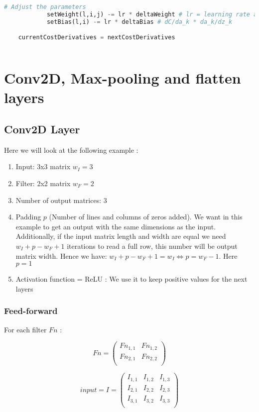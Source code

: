 \documentclass[11pt,a4paper]{report}
\begin{document}
\begin{lstlisting}[language=Python]
            # Adjust the parameters
            setWeight(l,i,j) -= lr * deltaWeight # lr = learning rate and we have dC/da_k * da_k/dz_k * dz_k/dw_i,j
            setBias(l,i) -= lr * deltaBias # dC/da_k * da_k/dz_k

    currentCostDerivatives = nextCostDerivatives
   
\end{lstlisting}

\newpage
\section{Conv2D, Max-pooling and flatten layers}

\subsection{Conv2D Layer}
Here we will look at the following example :
\begin{enumerate}
    \item Input: 3x3 matrix $w_I = 3$
    \item Filter: 2x2 matrix $w_F = 2$
    \item Number of output matrices: 3
    \item Padding $p$ (Number of lines and columns of zeros added). We want in this example to get an output with the same dimensions as the input. Additionally, if the input matrix length and width are equal we need $w_I + p - w_F + 1$ iterations to read a full row, this number will be output matrix width. Hence we have: $w_I + p - w_F + 1 = w_I \Leftrightarrow p = w_F - 1$. Here $p = 1$
    \item Activation function = ReLU : We use it to keep positive values for the next layers
\end{enumerate}
\subsubsection{Feed-forward}

For each filter $Fn$ :

\begin{equation}
Fn = \begin{pmatrix}
Fn_{1,1} & Fn_{1,2} \\
Fn_{2,1} & Fn_{2,2} \\
\end{pmatrix}
\end{equation}

\begin{equation}
input = I = \begin{pmatrix}
I_{1,1} & I_{1,2} & I_{1,3} \\
I_{2,1} & I_{2,2} & I_{2,3} \\
I_{3,1} & I_{3,2} & I_{3,3} \\
\end{pmatrix}
\end{equation}
\end{document}
